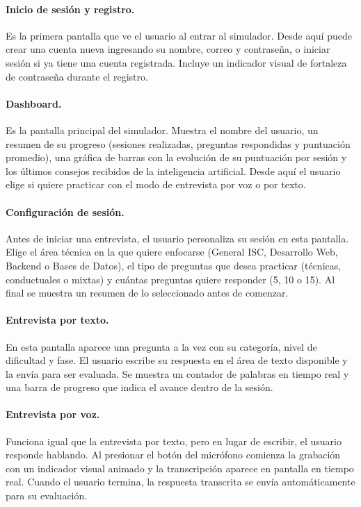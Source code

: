 \paragraph{Inicio de sesión y registro.}
Es la primera pantalla que ve el usuario al entrar al simulador.
Desde aquí puede crear una cuenta nueva ingresando su nombre, correo
y contraseña, o iniciar sesión si ya tiene una cuenta registrada.
Incluye un indicador visual de fortaleza de contraseña durante
el registro.

\paragraph{Dashboard.}
Es la pantalla principal del simulador. Muestra el nombre del usuario,
un resumen de su progreso (sesiones realizadas, preguntas respondidas
y puntuación promedio), una gráfica de barras con la evolución de
su puntuación por sesión y los últimos consejos recibidos de la
inteligencia artificial. Desde aquí el usuario elige si quiere
practicar con el modo de entrevista por voz o por texto.

\paragraph{Configuración de sesión.}
Antes de iniciar una entrevista, el usuario personaliza su sesión
en esta pantalla. Elige el área técnica en la que quiere enfocarse
(General ISC, Desarrollo Web, Backend o Bases de Datos), el tipo de
preguntas que desea practicar (técnicas, conductuales o mixtas) y
cuántas preguntas quiere responder (5, 10 o 15). Al final se muestra
un resumen de lo seleccionado antes de comenzar.

\paragraph{Entrevista por texto.}
En esta pantalla aparece una pregunta a la vez con su categoría,
nivel de dificultad y fase. El usuario escribe su respuesta en el
área de texto disponible y la envía para ser evaluada. Se muestra
un contador de palabras en tiempo real y una barra de progreso que
indica el avance dentro de la sesión.

\paragraph{Entrevista por voz.}
Funciona igual que la entrevista por texto, pero en lugar de
escribir, el usuario responde hablando. Al presionar el botón del
micrófono comienza la grabación con un indicador visual animado y
la transcripción aparece en pantalla en tiempo real. Cuando el
usuario termina, la respuesta transcrita se envía automáticamente
para su evaluación.

